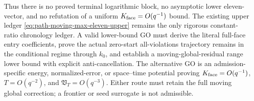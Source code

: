 Thus there is no proved terminal logarithmic block, no asymptotic lower
eleven-vector, and no refutation of a uniform
$K_{\rm face}=O(q^{-1})$ bound.  The existing upper ledger
\cref{eq:path-moving-max-eleven-upper} remains the only rigorous
constant-ratio chronology ledger.  A valid lower-bound GO must derive the
literal full-face entry coefficients, prove the actual zero-start
all-violations trajectory remains in the conditional regime through $k_0$,
and establish a moving-global-residual range lower bound with explicit
anti-cancellation.  The alternative GO is an admission-specific energy,
normalized-error, or space--time potential proving
$K_{\rm face}=O(q^{-1})$, $T=O(q^{-2})$, and
$\mathfrak V_T=O(q^{-3})$.  Either route must retain the full moving global
correction; a frontier or seed surrogate is not admissible.

